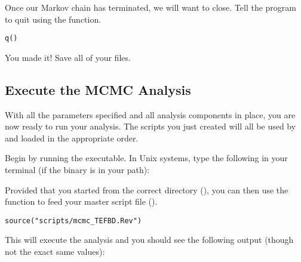 Once our Markov chain has terminated, we will want \RevBayes to close. 
Tell the program to quit using the  function.
{\tt \begin{snugshade*}
\begin{lstlisting}
q()
\end{lstlisting}
\end{snugshade*}}

{\begin{framed}
You made it! Save all of your files.
\end{framed}}

\bigskip
\subsection{Execute the MCMC Analysis}\label{subsect:Exercise-RunMCMC}

With all the parameters specified and all analysis components in place, you are now ready to run your analysis. 
The \Rev scripts you just created will all be used by \RevBayes and loaded in the appropriate order.

{\begin{framed}
Begin by running the \RevBayes executable. In Unix systems, type the following in your terminal (if the \RevBayes binary is in your path):

\colorbox{black}{\strut\hspace{1mm}\textcolor[rgb]{0,1,1}{}\hspace{0.925\textwidth}}
\end{framed}}

Provided that you started \RevBayes from the correct directory (), you can then use the  function to feed \RevBayes your master script file ().
{\tt \begin{snugshade*}
\begin{lstlisting}
source("scripts/mcmc_TEFBD.Rev")
\end{lstlisting}
\end{snugshade*}}

This will execute the analysis and you should see the following output (though not the exact same values):

